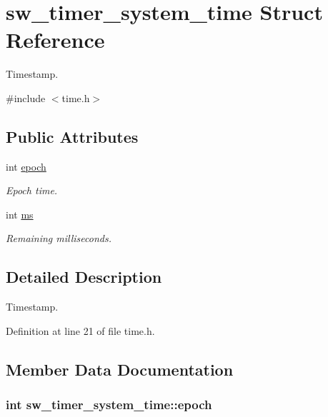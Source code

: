 \hypertarget{structsw__timer__system__time}{}\section{sw\+\_\+timer\+\_\+system\+\_\+time Struct Reference}
\label{structsw__timer__system__time}


Timestamp.  




{\ttfamily \#include $<$time.\+h$>$}

\subsection*{Public Attributes}
\begin{DoxyCompactItemize}
\item 
int \hyperlink{structsw__timer__system__time_aa9f10bc219cafbf8c61f94fbb4138591}{epoch}
\begin{DoxyCompactList}\small\item\em Epoch time. \end{DoxyCompactList}\item 
int \hyperlink{structsw__timer__system__time_aafb47623ce45c3d1617e54d2025b679a}{ms}
\begin{DoxyCompactList}\small\item\em Remaining milliseconds. \end{DoxyCompactList}\end{DoxyCompactItemize}


\subsection{Detailed Description}
Timestamp. 

Definition at line 21 of file time.\+h.



\subsection{Member Data Documentation}
\hypertarget{structsw__timer__system__time_aa9f10bc219cafbf8c61f94fbb4138591}{}
\subsubsection[{epoch}]{\setlength{\rightskip}{0pt plus 5cm}int sw\+\_\+timer\+\_\+system\+\_\+time\+::epoch}\label{structsw__timer__system__time_aa9f10bc219cafbf8c61f94fbb4138591}



